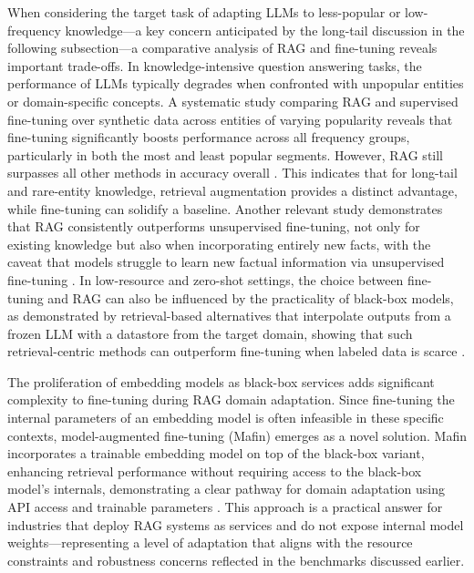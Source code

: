 \documentclass[11pt]{article}
\begin{document}
When considering the target task of adapting LLMs to less-popular or low-frequency knowledge---a key concern anticipated by the long-tail discussion in the following subsection---a comparative analysis of RAG and fine-tuning reveals important trade-offs. In knowledge-intensive question answering tasks, the performance of LLMs typically degrades when confronted with unpopular entities or domain-specific concepts. A systematic study comparing RAG and supervised fine-tuning over synthetic data across entities of varying popularity reveals that fine-tuning significantly boosts performance across all frequency groups, particularly in both the most and least popular segments. However, RAG still surpasses all other methods in accuracy overall \cite{ref77}. This indicates that for long-tail and rare-entity knowledge, retrieval augmentation provides a distinct advantage, while fine-tuning can solidify a baseline. Another relevant study demonstrates that RAG consistently outperforms unsupervised fine-tuning, not only for existing knowledge but also when incorporating entirely new facts, with the caveat that models struggle to learn new factual information via unsupervised fine-tuning \cite{ref74}. In low-resource and zero-shot settings, the choice between fine-tuning and RAG can also be influenced by the practicality of black-box models, as demonstrated by retrieval-based alternatives that interpolate outputs from a frozen LLM with a datastore from the target domain, showing that such retrieval-centric methods can outperform fine-tuning when labeled data is scarce \cite{ref212}.

The proliferation of embedding models as black-box services adds significant complexity to fine-tuning during RAG domain adaptation. Since fine-tuning the internal parameters of an embedding model is often infeasible in these specific contexts, model-augmented fine-tuning (Mafin) emerges as a novel solution. Mafin incorporates a trainable embedding model on top of the black-box variant, enhancing retrieval performance without requiring access to the black-box model's internals, demonstrating a clear pathway for domain adaptation using API access and trainable parameters \cite{ref54}. This approach is a practical answer for industries that deploy RAG systems as services and do not expose internal model weights---representing a level of adaptation that aligns with the resource constraints and robustness concerns reflected in the benchmarks discussed earlier.
\end{document}
